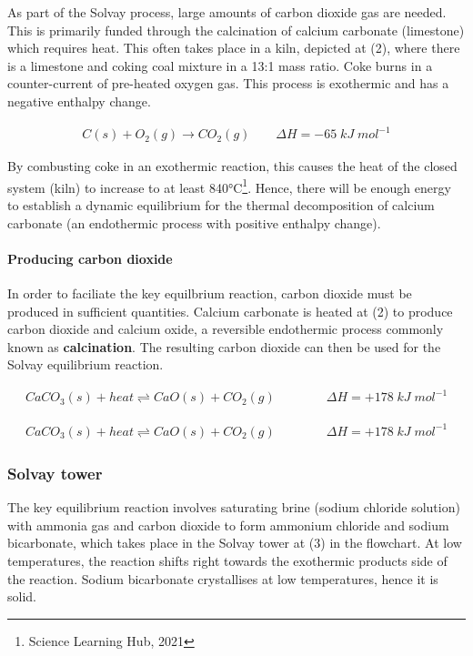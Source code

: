 \documentclass[12pt, a4paper]{article}
\begin{document}
As part of the Solvay process, large amounts of carbon dioxide gas are needed. This is primarily funded through the calcination of calcium carbonate (limestone) which requires heat. This often takes place in a kiln, depicted at (2), where there is a limestone and coking coal mixture in a 13:1 mass ratio. Coke burns in a counter-current of pre-heated oxygen gas. This process is exothermic and has a negative enthalpy change.

\begin{align}
	C(s) + O_{2}(g) \rightarrow CO_{2}(g) \qquad \Delta H = -65 \; kJ \; mol^{-1}
\end{align}

By combusting coke in an exothermic reaction, this causes the heat of the closed system (kiln) to increase to at least 840°C\footnote{Science Learning Hub, 2021}. Hence, there will be enough energy to establish a dynamic equilibrium for the thermal decomposition of calcium carbonate (an endothermic process with positive enthalpy change).


\paragraph{Producing carbon dioxide}

In order to faciliate the key equilbrium reaction, carbon dioxide must be produced in sufficient quantities. Calcium carbonate is heated at (2) to produce carbon dioxide and calcium oxide, a reversible endothermic process commonly known as \textbf{calcination}. The resulting carbon dioxide can then be used for the Solvay equilibrium reaction.

\begin{align}
	CaCO_{3}(s) + heat \rightleftharpoons CaO(s) + CO_{2}(g) \qquad \qquad \Delta H = +178 \; kJ \; mol^{-1}
\end{align}


\begin{align}
	CaCO_{3}(s) + heat \rightleftharpoons CaO(s) + CO_{2}(g) \qquad \qquad \Delta H = +178 \; kJ \; mol^{-1}
\end{align}


\subsubsection{Solvay tower}

The key equilibrium reaction involves saturating brine (sodium chloride solution) with ammonia gas and carbon dioxide to form ammonium chloride and sodium bicarbonate, which takes place in the Solvay tower at (3) in the flowchart. At low temperatures, the reaction shifts right towards the exothermic products side of the reaction. Sodium bicarbonate crystallises at low temperatures, hence it is solid.
\end{document}
